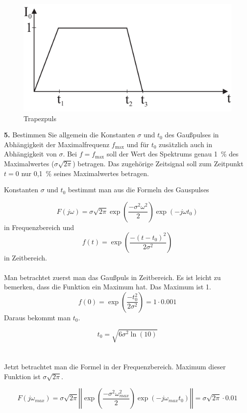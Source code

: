 \documentclass[Protokollheft.tex]{subfiles}
\begin{document}
\begin{figure}[ht]
	\centering
    \includegraphics[scale=0.9]{v7_trapez.pdf}
    \caption{Trapezpuls}\label{tra}
\end{figure}

\begin{framed}
	\noindent \textbf{5.} Bestimmen Sie allgemein die Konstanten $\sigma$ und $t_0$
des Gaußpulses in Abhängigkeit der Maximalfrequenz $f_{\text{max}}$ 
und für $t_0$ zusätzlich auch in Abhängigkeit von $\sigma$. Bei
$f=f_{\text{max}}$ soll der Wert des Spektrums genau 1~\% des
Maximalwertes ($\sigma\sqrt{2\pi}$) betragen. Das zugehörige
Zeitsignal soll zum Zeitpunkt $t=0$ nur 0,1~\% seines
Maximalwertes betragen.\label{exer:calcGaussConst}
\end{framed}

Konstanten $\sigma$ und $t_0$ bestimmt man aus die Formeln des Gauspulses

$$ F(j\omega)=\sigma\sqrt{2\pi}\exp\left(\frac{-\sigma^2\omega^2}{2}\right)\exp\left(-j\omega t_0\right)$$ in Frequenzbereich und
$$
f(t)=\exp\left( \frac{-(t-t_0)^2}{2\sigma^2}         \right)
$$
in Zeitbereich.
\\
\\
Man betrachtet zuerst man das Gaußpuls in Zeitbereich. Es ist leicht zu bemerken, dass die Funktion ein Maximum hat. Das Maximum ist 1.
$$f(0)=\exp\left( \frac{-t_0^2}{2\sigma^2}    \right)= 1 \cdot 0.001$$
Daraus bekommt man $t_0$.

$$t_0 = \sqrt{6\sigma^2\ln(10)} $$
\\
\\
Jetzt betrachtet man die Formel in der Frequenzbereich. Maximum dieser Funktion ist $\sigma\sqrt{2\pi}$.

$$ F(j\omega_{max})=\sigma\sqrt{2\pi}\left|\left|\exp\left(\frac{-\sigma^2\omega_{max}^2}{2}\right)\exp\left(-j\omega_{max} t_0\right)\right|\right|=\sigma\sqrt{2\pi}\cdot 0.01$$
\end{document}
